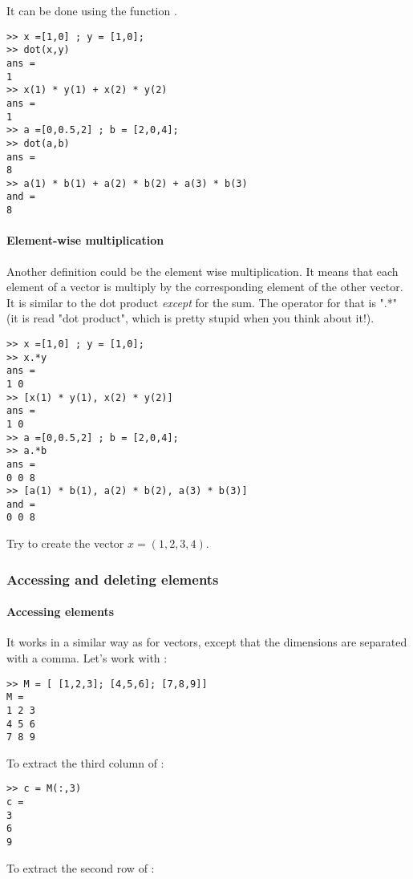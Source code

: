 It can be done using the function .
\begin{lstlisting}
>> x =[1,0] ; y = [1,0];
>> dot(x,y)
ans = 
1
>> x(1) * y(1) + x(2) * y(2)
ans =
1
>> a =[0,0.5,2] ; b = [2,0,4];
>> dot(a,b)
ans = 
8
>> a(1) * b(1) + a(2) * b(2) + a(3) * b(3)    
and =
8
\end{lstlisting}


\paragraph{Element-wise multiplication}
Another definition could be the element wise multiplication.
It means that each element of a vector is multiply by the corresponding element of the other vector.
It is similar to the dot product \emph{except} for the sum.
The operator for that is ".*" (it is read "dot product", which is pretty stupid when you think about it!).

\begin{lstlisting}
>> x =[1,0] ; y = [1,0];
>> x.*y
ans = 
1 0
>> [x(1) * y(1), x(2) * y(2)]
ans =
1 0
>> a =[0,0.5,2] ; b = [2,0,4];
>> a.*b
ans = 
0 0 8
>> [a(1) * b(1), a(2) * b(2), a(3) * b(3)]
and =
0 0 8
\end{lstlisting}



Try to create the vector $x = (1,2,3,4)$.



\subsubsection{Accessing and deleting elements}

\paragraph{Accessing elements}
It works in a similar way as for vectors, except that the dimensions are separated with a comma.
Let's work with :
\begin{lstlisting}
>> M = [ [1,2,3]; [4,5,6]; [7,8,9]]
M = 
1 2 3
4 5 6
7 8 9
\end{lstlisting}

To extract the third column of :

\begin{lstlisting}
>> c = M(:,3)
c = 
3
6
9
\end{lstlisting}


To extract the second row of :

